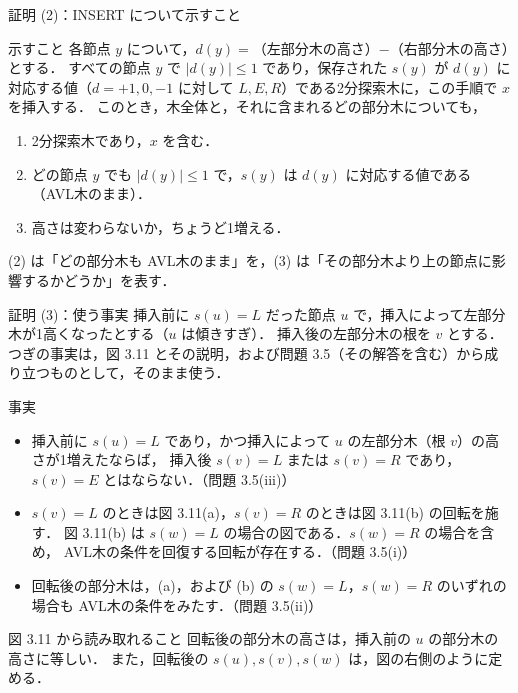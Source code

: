 \documentclass[aspectratio=169,11pt]{beamer}
\begin{document}
\begin{frame}{証明 (2)：INSERT について示すこと}
  \footnotesize
  \begin{alertblock}{示すこと}
    各節点 $y$ について，$d(y)=$（左部分木の高さ）$-$（右部分木の高さ）とする．
    すべての節点 $y$ で $|d(y)|\le1$ であり，保存された $s(y)$ が $d(y)$ に対応する値（$d=+1,0,-1$ に対して $L,E,R$）である2分探索木に，この手順で $x$ を挿入する．
    このとき，木全体と，それに含まれる\alert{どの部分木}についても，
    \begin{enumerate}[(1)]
      \item 2分探索木であり，$x$ を含む．
      \item どの節点 $y$ でも $|d(y)|\le1$ で，$s(y)$ は $d(y)$ に対応する値である（\alert{AVL木のまま}）．
      \item 高さは変わらないか，ちょうど1増える．
    \end{enumerate}
  \end{alertblock}
  \vspace{4pt}
  (2) は「どの部分木も AVL木のまま」を，(3) は「その部分木より上の節点に影響するかどうか」を表す．
\end{frame}

\begin{frame}{証明 (3)：使う事実}
  \footnotesize
  挿入前に $s(u)=L$ だった節点 $u$ で，挿入によって左部分木が1高くなったとする（$u$ は傾きすぎ）．
  挿入後の左部分木の根を $v$ とする．
  つぎの事実は，図 3.11 とその説明，および問題 3.5（その解答を含む）から成り立つものとして，そのまま使う．
  \begin{block}{事実}
    \begin{itemize}
      \item[(F1)] 挿入前に $s(u)=L$ であり，かつ挿入によって $u$ の左部分木（根 $v$）の高さが1増えたならば，
        挿入後 $s(v)=L$ または $s(v)=R$ であり，$s(v)=E$ とはならない．（問題 3.5(iii)）
      \item[(F2)] $s(v)=L$ のときは図 3.11(a)，$s(v)=R$ のときは図 3.11(b) の回転を施す．
        図 3.11(b) は $s(w)=L$ の場合の図である．$s(w)=R$ の場合を含め，
        AVL木の条件を回復する回転が存在する．（問題 3.5(i)）
      \item[(F3)] 回転後の部分木は，(a)，および (b) の $s(w)=L$，$s(w)=R$ のいずれの場合も AVL木の条件をみたす．（問題 3.5(ii)）
    \end{itemize}
  \end{block}
  \begin{block}{図 3.11 から読み取れること}
    回転後の部分木の高さは，挿入前の $u$ の部分木の高さに等しい．
    また，回転後の $s(u),s(v),s(w)$ は，図の右側のように定める．
  \end{block}
\end{frame}
\end{document}
